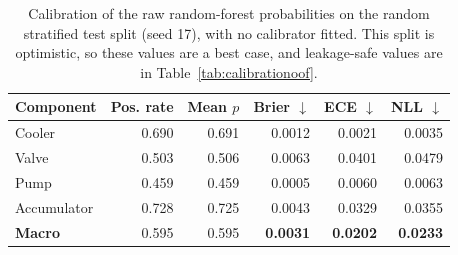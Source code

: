\begin{table}[t]
\centering
\caption{Calibration of the raw random-forest probabilities on the random stratified test split (seed 17), with no calibrator fitted. This split is optimistic, so these values are a best case, and leakage-safe values are in Table~\ref{tab:calibrationoof}.}
\label{tab:calibration}
\footnotesize
\begin{tabular}{lrrrrr}
\toprule
Component & Pos. rate & Mean $p$ & Brier $\downarrow$ & ECE $\downarrow$ & NLL $\downarrow$ \\
\midrule
Cooler & 0.690 & 0.691 & 0.0012 & 0.0021 & 0.0035 \\
Valve & 0.503 & 0.506 & 0.0063 & 0.0401 & 0.0479 \\
Pump & 0.459 & 0.459 & 0.0005 & 0.0060 & 0.0063 \\
Accumulator & 0.728 & 0.725 & 0.0043 & 0.0329 & 0.0355 \\
\midrule
\textbf{Macro} & 0.595 & 0.595 & \textbf{0.0031} & \textbf{0.0202} & \textbf{0.0233} \\
\bottomrule
\end{tabular}
\end{table}
